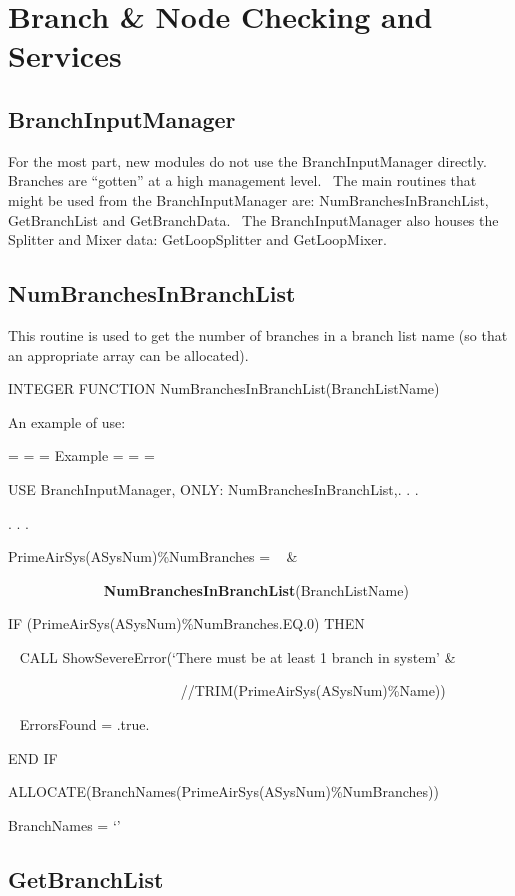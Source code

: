 \section{Branch \& Node Checking and Services}\label{branch-node-checking-and-services}

\subsection{BranchInputManager}\label{branchinputmanager}

For the most part, new modules do not use the BranchInputManager directly.~ Branches are ``gotten'' at a high management level.~ The main routines that might be used from the BranchInputManager are: NumBranchesInBranchList, GetBranchList and GetBranchData.~ The BranchInputManager also houses the Splitter and Mixer data: GetLoopSplitter and GetLoopMixer.

\subsection{NumBranchesInBranchList}\label{numbranchesinbranchlist}

This routine is used to get the number of branches in a branch list name (so that an appropriate array can be allocated).

INTEGER FUNCTION NumBranchesInBranchList(BranchListName)

An example of use:

= = = Example = = =

USE BranchInputManager, ONLY: NumBranchesInBranchList,. . .

. . .

PrimeAirSys(ASysNum)\%NumBranches = ~ \&

~~~~~~~~~~~~~ \textbf{NumBranchesInBranchList}(BranchListName)

IF (PrimeAirSys(ASysNum)\%NumBranches.EQ.0) THEN

~ CALL ShowSevereError(`There must be at least 1 branch in system' \&

~~~~~~~~~~~~~~~~~~ ~~~~~~//TRIM(PrimeAirSys(ASysNum)\%Name))

~ ErrorsFound = .true.

END IF

ALLOCATE(BranchNames(PrimeAirSys(ASysNum)\%NumBranches))

BranchNames = `'

\subsection{GetBranchList}\label{getbranchlist}

